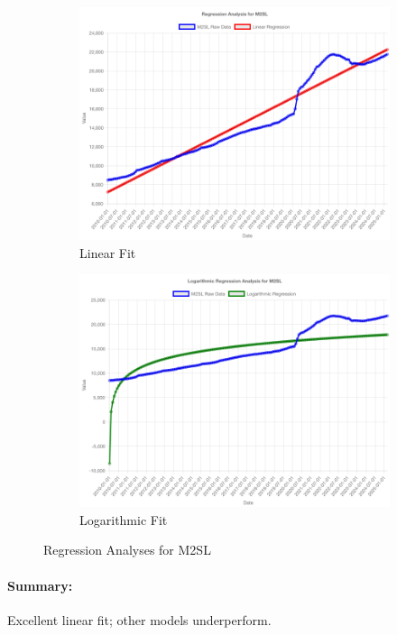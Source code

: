 \documentclass[11pt,a4paper]{article}
\begin{document}
\begin{figure}[htbp]
  \centering
  \begin{subfigure}[b]{0.48\textwidth}
    \includegraphics[width=\textwidth]{backend/analyses/M2SL_analysis.png}
    \caption{Linear Fit}
  \end{subfigure}
  \hfill
  \begin{subfigure}[b]{0.48\textwidth}
    \includegraphics[width=\textwidth]{backend/analyses/M2SL_log_analysis.png}
    \caption{Logarithmic Fit}
  \end{subfigure}
  \caption{Regression Analyses for M2SL}
\end{figure}

\paragraph{Summary:}
Excellent linear fit; other models underperform.
\end{document}
